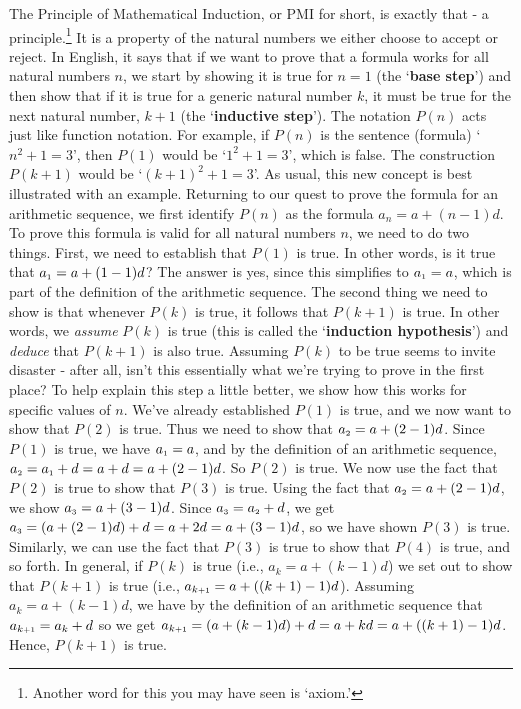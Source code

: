 \smallskip

The Principle of Mathematical Induction, or PMI for short, is exactly that - a principle.\footnote{Another word for this you may have seen is `axiom.'}  It is a property of the natural numbers we either choose to accept or reject.  In English, it says that if we want to prove that a formula works for all natural numbers $n$, we start by showing it is true for $n=1$ (the  `\textbf{base step}') and then show that if it is true for a generic natural number $k$, it must be true for the next natural number, $k+1$ (the  `\textbf{inductive step}'). The notation $P(n)$ acts just like function notation.  For example, if $P(n)$ is the sentence (formula)  `$n^2 + 1 = 3$', then $P(1)$ would be `$1^2 + 1 = 3$', which is false.  The construction $P(k+1)$ would be `$(k+1)^2 + 1 = 3$'.  As usual, this new concept is best illustrated with an example.  Returning to our quest to prove the formula for an arithmetic sequence, we first identify $P(n)$ as the formula $a_{n} = a + (n-1)d$.  To prove this formula is valid for all natural numbers $n$, we need to do two things.  First, we need to establish that $P(1)$ is true.  In other words, is it true that $a_{\mbox{\tiny$1$}} = a + (1-1)d$?  The answer is yes, since this simplifies to $a_{\mbox{\tiny$1$}} = a$, which is part of the definition of the arithmetic sequence.  The second thing we need to show is that whenever $P(k)$ is true, it follows that $P(k+1)$ is true.  In other words, we \textit{assume} $P(k)$ is true (this is called the `\textbf{induction hypothesis}') and \textit{deduce} that $P(k+1)$ is also true.  Assuming $P(k)$ to be true seems to invite disaster - after all, isn't this essentially what we're trying to prove in the first place? To help explain this step a little better, we show how this works for specific values of $n$.  We've already established $P(1)$ is true, and we now want to show that $P(2)$ is true.  Thus we need to show that $a_{\mbox{\tiny$2$}} = a + (2-1)d$.  Since $P(1)$ is true, we have $a_{\mbox{\tiny$1$}} = a$, and by the definition of an arithmetic sequence, $a_{\mbox{\tiny$2$}}= a_{\mbox{\tiny$1$}} + d = a + d = a + (2-1)d$.  So $P(2)$ is true.  We now use the fact that $P(2)$ is true to show that $P(3)$ is true.  Using the fact that $a_{\mbox{\tiny$2$}} = a + (2-1)d$, we show $a_{\mbox{\tiny$3$}} = a + (3-1)d$.  Since $a_{\mbox{\tiny$3$}} = a_{\mbox{\tiny$2$}} + d$, we get $a_{\mbox{\tiny$3$}}= (a + (2-1)d) + d = a + 2d = a+(3-1)d$, so we have shown $P(3)$ is true.  Similarly, we can use the fact that $P(3)$ is true to show that $P(4)$ is true, and so forth.  In general, if $P(k)$ is true (i.e., $a_{k} = a + (k-1)d$) we set out to show that $P(k+1)$ is true (i.e., $a_{k\mbox{\tiny$ + 1$}} = a + ((k+1)-1)d$).  Assuming $a_{k} = a + (k-1)d$, we have by the definition of an arithmetic sequence that $a_{k\mbox{\tiny$ + 1$}} = a_{k} + d$ so we get $a_{k\mbox{\tiny$ + 1$}} = (a+(k-1)d) + d = a + kd = a + ((k+1)-1)d$. Hence, $P(k+1)$ is true. 


